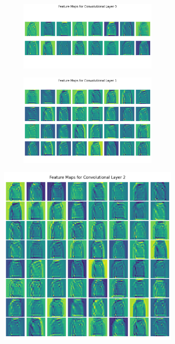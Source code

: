\documentclass[11pt]{amsart}
\begin{document}
\begin{figure}[h]
	\centering
	\begin{subfigure}{0.49\textwidth}
    		\begin{subfigure}{\textwidth}
        			\centering
			\includegraphics[width=.9\textwidth]{../visualizations/feature_maps_conv_layer_0.png}
	    	\end{subfigure}
		\begin{subfigure}{\textwidth}
			\centering
			\includegraphics[width=.9\textwidth]{../visualizations/feature_maps_conv_layer_1.png}
		\end{subfigure}
	\end{subfigure}
	\begin{subfigure}{0.49\textwidth}
		\centering
        		\includegraphics[width=.9\textwidth]{../visualizations/feature_maps_conv_layer_2.png}

\end{subfigure}
\end{figure}
\end{document}
